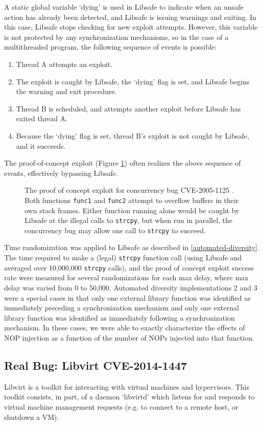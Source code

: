 A static global variable `dying' is used in Libsafe to indicate when an unsafe action has already been detected, and Libsafe is issuing warnings and exiting.  In this case, Libsafe stops checking for new exploit attempts.  However, this variable is not protected by any synchronization mechanisms, so in the case of a multithreaded program, the following sequence of events is possible:
\begin{enumerate}
	\item Thread A attempts an exploit.
	\item The exploit is caught by Libsafe, the `dying' flag is set, and Libsafe begins the warning and exit procedure.
	\item Thread B is scheduled, and attempts another exploit before Libsafe has exited thread A.
	\item Because the `dying' flag is set, thread B's exploit is not caught by Libsafe, and it succeeds.
\end{enumerate}
The proof-of-concept exploit (Figure \ref{fig_poc})\cite{Bugtraq13190} often realizes the above sequence of events, effectively bypassing Libsafe.
\begin{figure}
	
	\caption{The proof of concept exploit for concurrency bug CVE-2005-1125 \cite{CVE-2005-1125}.  Both functions \texttt{func1} and \texttt{func2} attempt to overflow buffers in their own stack frames.  Either function running alone would be caught by Libsafe at the illegal calls to \texttt{strcpy}, but when run in parallel, the concurrency bug may allow one call to \texttt{strcpy} to succeed.}
	\label{fig_poc}
\end{figure}

Time randomization was applied to Libsafe as described in \autoref{automated-diversity}.
The time required to make a (legal) \texttt{strcpy} function call (using Libsafe and averaged over 10,000,000 \texttt{strcpy} calls), and the proof of concept exploit success rate were measured for several randomizations for each max delay, where max delay was varied from 0 to 50,000.
Automated diversity implementations 2 and 3 were a special cases in that only one external library function was identified as immediately preceding a synchronization mechanism and only one external library function was identified as immediately following a synchronization mechanism.
In these cases, we were able to exactly characterize the effects of NOP injection as a function of the number of NOPs injected into that function.
\subsection{Real Bug: Libvirt CVE-2014-1447}
Libvirt \cite{libvirt} is a toolkit for interacting with virtual machines and hypervisors.
This toolkit consists, in part, of a daemon `libvirtd' which listens for and responds to virtual machine management requests (e.g. to connect to a remote host, or shutdown a VM).

